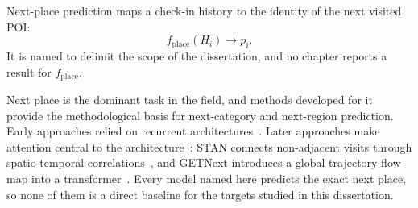 \begin{definition}\label{def:fund:nextplace}
    Next-place prediction maps a check-in history to the identity of the next visited POI:
    \begin{equation}
        f_{\mathrm{place}}(H_i)\longrightarrow p_i.
    \end{equation}
    It is named to delimit the scope of the dissertation, and no chapter reports a result
    for $f_{\mathrm{place}}$.
\end{definition}

Next place is the dominant task in the field, and methods developed for it provide the
methodological basis for next-category and next-region prediction.
Early approaches relied on recurrent
architectures~\cite{liu2016strnn,feng2018deepmove,kong2018hstlstm,yang2020flashback}.
Later approaches make attention central to the architecture~\cite{lian2020geosan}: STAN
connects non-adjacent visits through spatio-temporal correlations~\cite{luo2021stan},
and GETNext introduces a global trajectory-flow map into a
transformer~\cite{yang2022getnext}. Every model named here predicts the exact next
place, so none of them is a direct baseline for the targets studied in this dissertation.

